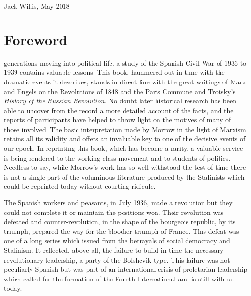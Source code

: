 \vfill

\begin{flushright}
	\textsf{Jack Willis}, May 2018
\end{flushright}


\chapter{Foreword}

 generations moving into political life, a study of the Spanish Civil War of 1936 to 1939 contains valuable lessons. This book, hammered out in time with the dramatic events it describes, stands in direct line with the great writings of Marx and Engels on the Revolutions of 1848 and the Paris Commune and Trotsky’s \emph{History of the Russian Revolution.} No doubt later historical research has been able to uncover from the record a more detailed account of the facts, and the reports of participants have helped to throw light on the motives of many of those involved. The basic interpretation made by Morrow in the light of Marxism retains all its validity and offers an invaluable key to one of the decisive events of our epoch. In reprinting this book, which has become a rarity, a valuable service is being rendered to the working-class movement and to students of politics. Needless to say, while Morrow’s work has so well withstood the test of time there is not a single part of the voluminous literature produced by the Stalinists which could be reprinted today without courting ridicule.

The Spanish workers and peasants, in July 1936, made a revolution but they could not complete it or maintain the positions won. Their revolution was defeated and  counter-revolution, in the shape of the bourgeois republic, by its triumph, prepared the way for the bloodier triumph of Franco. This defeat was one of a long series which issued from the betrayals of social democracy and Stalinism. It reflected, above all, the failure to build in time the necessary revolutionary leadership, a party of the Bolshevik type. This failure was not peculiarly Spanish but was part of an international crisis of proletarian leadership which called for the formation of the Fourth International and is still with us today.
\nowidow

